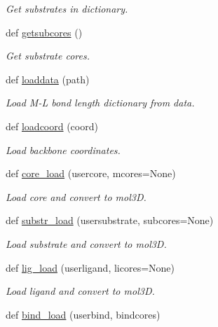 \begin{DoxyCompactItemize}
\begin{DoxyCompactList}\small\item\em Get substrates in dictionary. \end{DoxyCompactList}\item 
def \hyperlink{namespacemolSimplify_1_1Scripts_1_1io_a737fb5f3188826264d70c1005c4ca6f0}{getsubcores} ()
\begin{DoxyCompactList}\small\item\em Get substrate cores. \end{DoxyCompactList}\item 
def \hyperlink{namespacemolSimplify_1_1Scripts_1_1io_adfd1292cc6dcfdbf6b828fe5e7d9ae1f}{loaddata} (path)
\begin{DoxyCompactList}\small\item\em Load M-\/L bond length dictionary from data. \end{DoxyCompactList}\item 
def \hyperlink{namespacemolSimplify_1_1Scripts_1_1io_a9b697216ad214b0fb51a6228c062bd9a}{loadcoord} (coord)
\begin{DoxyCompactList}\small\item\em Load backbone coordinates. \end{DoxyCompactList}\item 
def \hyperlink{namespacemolSimplify_1_1Scripts_1_1io_a0eec4377fe71927746ad97bbdc8d2d34}{core\+\_\+load} (usercore, mcores=None)
\begin{DoxyCompactList}\small\item\em Load core and convert to mol3D. \end{DoxyCompactList}\item 
def \hyperlink{namespacemolSimplify_1_1Scripts_1_1io_a350e85d6a6af41250a4b243f870d3cb0}{substr\+\_\+load} (usersubstrate, subcores=None)
\begin{DoxyCompactList}\small\item\em Load substrate and convert to mol3D. \end{DoxyCompactList}\item 
def \hyperlink{namespacemolSimplify_1_1Scripts_1_1io_ae7d8c9d78258b791b5e30d8610c65044}{lig\+\_\+load} (userligand, licores=None)
\begin{DoxyCompactList}\small\item\em Load ligand and convert to mol3D. \end{DoxyCompactList}\item 
def \hyperlink{namespacemolSimplify_1_1Scripts_1_1io_ad95d532bb8edb4c9c6ee556ba093b7e1}{bind\+\_\+load} (userbind, bindcores)

\end{DoxyCompactItemize}
